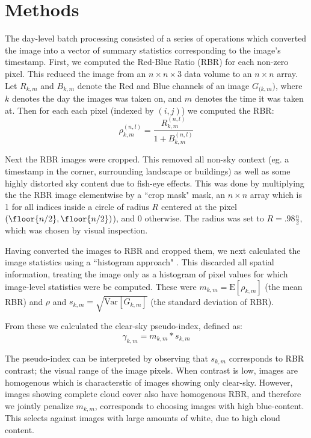 \documentclass{article}
\begin{document}
\section{Methods}
The day-level batch processing consisted of a series of operations which converted the image into a vector of summary statistics corresponding to the image's timestamp. First, we computed the Red-Blue Ratio (RBR) for each non-zero pixel. This reduced the image from an $n \times n \times 3$ data volume to an $n \times n$ array. Let $R_{k,m}$ and $B_{k,m}$ denote the Red and Blue channels of an image $G_{(k,m})$, where $k$ denotes the day the images was taken on, and $m$ denotes the time it was taken at. Then for each each pixel (indexed by $(i,j)$) we computed the RBR:
\begin{equation}
    \rho_{k,m}^{(n,l)} = \frac{ R_{k,m}^{(n,l)} }{ 1+B_{k,m}^{(n,l)} }
\end{equation}

Next the RBR images were cropped. This removed all non-sky context (eg. a timestamp in the corner, surrounding landscape or buildings) as well as some highly distorted sky content due to fish-eye effects. This was done by multiplying the the RBR image elementwise by a ``crop mask" mask, an $n \times n$ array which is 1 for all indices inside a circle of radius $R$ centered at the pixel $(\floor{n/2},\floor{n/2})$), and $0$ otherwise. The radius was set to $R=.98\frac{n}{2}$, which was chosen by visual inspection.

Having converted the images to RBR and cropped them, we next calculated the image statistics using a ``histogram approach" \citep{gonzales_digital_1992}. This discarded all spatial information, treating the image only as a histogram of pixel values for which image-level statistics were be computed. These were $m_{k,m} = \text{E}[\rho_{k,m}]$ (the mean RBR) and $\rho$ and $s_{k,m} = \sqrt{\text{Var}[G_{k,m}]}$ (the standard deviation of RBR). 

From these we calculated the clear-sky pseudo-index, defined as:
\begin{equation}
    \label{eq:csi}
    \gamma_{k,m} = m_{k,m}*s_{k,m}
\end{equation}

The pseudo-index can be interpreted by observing that $s_{k,m}$ corresponds to RBR contrast; the visual range of the image pixels. When contrast is low, images are homogenous which is characterstic of images showing only clear-sky. However, images showing complete cloud cover also have homogenous RBR, and therefore we jointly penalize $m_{k,m}$, corresponds to choosing images with  high blue-content. This selects against images with large amounts of white, due to high cloud content. 
\end{document}
